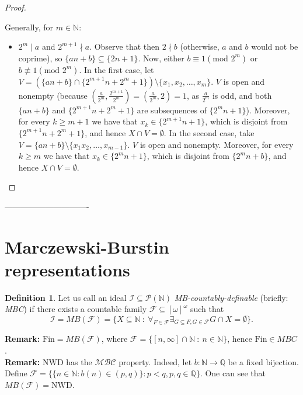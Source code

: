 \documentclass{amsart}
\theoremstyle{definition}
\newtheorem{df}{Definition}
\theoremstyle{definition}
\newcommand{\N}{{\mathbb N}}
\newcommand{\Q}{{\mathbb Q}}
\newcommand{\Fin}{\textrm{Fin}}
\newcommand{\I}{\mathcal I}
\newcommand{\J}{\mathcal J}
\begin{document}
\begin{proof}
\begin{itemize}
\end{itemize}
Generally, for $m\in\N$:
\begin{itemize}
 \item $2^m\mid a$ and $2^{m+1}\nmid a$. Observe that then $2 \nmid b$ (otherwise, $a$ and $b$ would not be coprime), so $\{an+b\}\subseteq \{2n+1\}$. Now, either $b\equiv 1 (\textrm{mod } 2^m)$ or $b \not\equiv 1 (\textrm{mod } 2^m)$. In the first case, let $V = (\{an+b\} \cap \{2^{m+1}n+2^m+1\})\setminus\{x_1, x_2,\ldots, x_m\}$. $V$ is open and nonempty (because $(\frac{a}{2^m},\frac{2^{m+1}}{2^m})=(\frac{a}{2^m},2)=1$, as $\frac{a}{2^m}$ is odd, and both $\{an+b\}$ and $\{2^{m+1}n+2^m+1\}$ are subsequences of $\{2^m n+1\}$). Moreover, for every $k\geq m+1$ we have that $x_k\in \{2^{m+1}n+1\}$, which is disjoint from $\{2^{m+1}n+2^m+1\}$, and hence $X\cap V = \emptyset$. In the second case, take $V = \{an+b\} \setminus\{x_1x_2,\ldots, x_{m-1}\}$. $V$ is open and nonempty. Moreover, for every $k\geq m$ we have that $x_k\in \{2^m n+1\}$, which is disjoint from $\{2^m n+b\}$, and hence $X\cap V = \emptyset$.
\end{itemize}
\end{proof}

-------------------------------




\color{black}
\section{Marczewski-Burstin representations}

\begin{df}
Let us call an ideal $\I\subseteq \mathcal{P}(\N)$ 
\emph{MB-countably-definable}
(briefly: \emph{MBC}) if there exists 
a countable family $\mathcal{F}\subseteq [\omega]^\omega$
such that
$$\I = MB(\mathcal{F}) = \{X\subseteq\N\ :\ \forall_{F\in\mathcal{F}} \exists_{G\subseteq F, G\in\mathcal{F}} G\cap X=\emptyset\}.$$
\end{df}
\textbf{Remark:} $\Fin = MB(\mathcal{F})$, where $\mathcal{F}= \{[n, \infty]\cap\N\ :\ n\in\N\}$, 
hence $\Fin\in MBC$.\\
\textbf{Remark:} $\mathrm{NWD}$ has the $\mathcal{MBC}$ property. Indeed, let $b\colon \N \to \Q$
be a fixed bijection. Define
$\mathcal{F} = \lbrace \lbrace n\in\N\colon b(n) \in (p, q)\rbrace\colon p < q, p, q \in \Q\rbrace$.
One can see that $MB(\mathcal{F}) = \mathrm{NWD}$.
		
\end{document}

